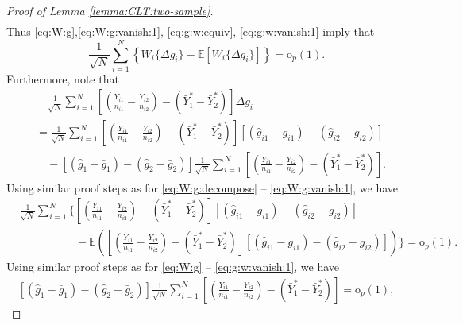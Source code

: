 \documentclass[12pt,letterpaper]{article}
\begin{document}
\begin{proof}[Proof of Lemma \ref{lemma:CLT:two-sample}]
\begin{equation}
\begin{array}{rl}
\end{array}
\end{equation}
Thus \eqref{eq:W:g},\eqref{eq:W:g:vanish:1}, \eqref{eq:g:w:equiv}, \eqref{eq:g:w:vanish:1} imply that
\begin{equation}\label{eq:delta:W:g:asymptotics}
    \frac{1}{\sqrt{N}}\sum_{i=1}^N\left\{W_i\{\Delta g_i\}-\mathbb{E}\left[W_i\{\Delta g_i\}\right]\right\}=\mathrm{o}_p(1).
\end{equation}
Furthermore, note that 
\begin{equation}\label{eq:delta:Y:g:term}
\begin{array}{rl}
    &\quad\displaystyle\frac{1}{\sqrt{N}}\sum_{i=1}^N\left[\left(\frac{Y_{i1}}{n_{i1}}-\frac{Y_{i2}}{n_{i2}}\right)-(\bar{Y}_1^*-\bar{Y}_2^*)\right]\Delta g_i\\
    &\displaystyle=\frac{1}{\sqrt{N}}\sum_{i=1}^N\left[\left(\frac{Y_{i1}}{n_{i1}}-\frac{Y_{i2}}{n_{i2}}\right)-(\bar{Y}_1^*-\bar{Y}_2^*)\right][(\hat{g}_{i1}-g_{i1})-(\hat{g}_{i2}-g_{i2})]\\
    &\quad\displaystyle-[(\hat{g}_1-\bar{g}_1)-(\hat{g}_2-\bar{g}_2)]\frac{1}{\sqrt{N}}\sum_{i=1}^N\left[\left(\frac{Y_{i1}}{n_{i1}}-\frac{Y_{i2}}{n_{i2}}\right)-(\bar{Y}_1^*-\bar{Y}_2^*)\right].
\end{array}
\end{equation}
Using similar proof steps as for \eqref{eq:W:g:decompose} -- \eqref{eq:W:g:vanish:1}, we have 
\begin{equation}\label{eq:Y:g:vanish:1}
\begin{array}{rl}
&\displaystyle\frac{1}{\sqrt{N}}\sum_{i=1}^N\Bigg\{\left[\left(\frac{Y_{i1}}{n_{i1}}-\frac{Y_{i2}}{n_{i2}}\right)-(\bar{Y}_1^*-\bar{Y}_2^*)\right][(\hat{g}_{i1}-g_{i1})-(\hat{g}_{i2}-g_{i2})]\\
&\quad\quad\quad\quad\quad\displaystyle-\mathbb{E}\left(\left[\left(\frac{Y_{i1}}{n_{i1}}-\frac{Y_{i2}}{n_{i2}}\right)-(\bar{Y}_1^*-\bar{Y}_2^*)\right][(\hat{g}_{i1}-g_{i1})-(\hat{g}_{i2}-g_{i2})]\right)\Bigg\}=\mathrm{o}_p(1).
\end{array}
\end{equation}
Using similar proof steps as for \eqref{eq:W:g} -- \eqref{eq:g:w:vanish:1}, we have 
\begin{equation}\label{eq:g:Y:vanish:2}
\begin{array}{rl}
    \displaystyle[(\hat{g}_1-\bar{g}_1)-(\hat{g}_2-\bar{g}_2)]\frac{1}{\sqrt{N}}\sum_{i=1}^N\left[\left(\frac{Y_{i1}}{n_{i1}}-\frac{Y_{i2}}{n_{i2}}\right)-(\bar{Y}_1^*-\bar{Y}_2^*)\right]=\mathrm{o}_p(1),

\end{array}
\end{equation}
\end{proof}
\end{document}

